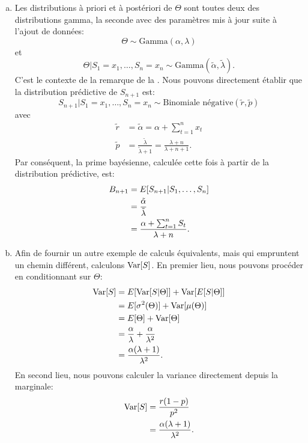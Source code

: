 \begin{exemple}
\begin{enumerate}[a)]
  \item Les distributions à priori et à postériori de $\Theta$
    sont toutes deux des distributions gamma, la seconde avec des
    paramètres mis à jour suite à l'ajout de données:
    \begin{equation*}
      \Theta \sim \text{Gamma}(\alpha, \lambda)
    \end{equation*}
    et
    \begin{equation*}
      \Theta|S_1 = x_1, \dots, S_n = x_n
      \sim \text{Gamma}(\tilde{\alpha}, \tilde{\lambda}).
    \end{equation*}
    C'est le contexte de la remarque de la
    . Nous pouvons directement
    établir que la distribution prédictive de $S_{n + 1}$ est:
    \begin{equation*}
      S_{n + 1}|S_1 = x_1, \dots, S_n = x_n
      \sim \text{Binomiale négative}(\tilde{r}, \tilde{p})
    \end{equation*}
    avec
    \begin{align*}
      \tilde{r}
      &= \tilde{\alpha} = \alpha + \sum_{t = 1}^n x_t \\
      \tilde{p}
      &= \frac{\tilde{\lambda}}{\tilde{\lambda} + 1} =
      \frac{\lambda + n}{\lambda + n + 1}.
    \end{align*}
    Par conséquent, la prime bayésienne, calculée cette fois à partir
    de la distribution prédictive, est:
    \begin{align*}
      B_{n + 1}
      &= E [ S_{n + 1}|S_1, \dots, S_n ] \\
      &= \frac{\tilde{\alpha}}{\tilde{\lambda}} \\
      &= \frac{\alpha + \sum_{t = 1}^n S_t}{\lambda + n}.
    \end{align*}

  \item Afin de fournir un autre exemple de calculs équivalents, mais
    qui empruntent un chemin différent, calculons $\operatorname{Var} [ S ]$. En
    premier lieu, nous pouvons procéder en conditionnant sur $\Theta$:
    \begin{align*}
      \operatorname{Var} [ S ]
      &= E [ \operatorname{Var} [ S|\Theta ] ] + \operatorname{Var} [ E [ S|\Theta ] ] \\
      &= E [ \sigma^2(\Theta) ] + \operatorname{Var} [ \mu(\Theta) ] \\
      &= E [ \Theta ] + \operatorname{Var} [ \Theta ] \\
      &= \frac{\alpha}{\lambda} + \frac{\alpha}{\lambda^2} \\
      &= \frac{\alpha (\lambda + 1)}{\lambda^2}.
    \end{align*}
    En second lieu, nous pouvons calculer la variance directement
    depuis la marginale:
    \begin{align*}
      \operatorname{Var} [ S ]
      &= \frac{r (1 - p)}{p^2} \\
      &= \frac{\alpha (\lambda + 1)}{\lambda^2}.
    \end{align*}


\end{enumerate}
\end{exemple}
